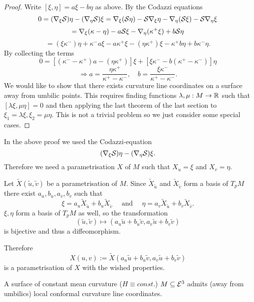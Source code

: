 \begin{proof}
	
	Write $ [\xi,\eta] = a\xi - b\eta $ as above. By the Codazzi equations
		\[ 0 = (\nabla_\xi \mathcal S)\eta - (\nabla_\eta \mathcal S) \xi = \nabla_\xi(\mathcal S\eta) - \mathcal S\nabla_\xi \eta - \nabla_\eta(\mathcal S\xi) - \mathcal S\nabla_\eta \xi  \]
		\[ = \nabla_\xi(\kappa- \eta) - a \mathcal S \xi - \nabla_\eta(\kappa^+\xi) + b\mathcal S\eta \]
		\[ = (\xi\kappa^-) \eta + \kappa^-a\xi -a\kappa^+\xi - (\eta\kappa^+)\xi - \kappa^+b\eta + b \kappa^-\eta. \]
	By collecting the terms
		\[ 0 = [ (\kappa^- -\kappa^+)a - (\eta\kappa^+) ]\xi + [ \xi \kappa^- - b(\kappa^+ - \kappa^-) ] \eta \]
		\[ \Rightarrow a = \dfrac{\eta \kappa^+}{\kappa^+ - \kappa^-}, \quad b= \dfrac{\xi \kappa^-}{\kappa^+ - \kappa^-}. \]
	We would like to show that there exists curvature line coordinates on a surface away from umbilic points. This requires finding functions $ \lambda,\mu: M \rightarrow \mathbb R $ such that $ [ \lambda\xi,\mu\eta ] = 0 $ and  then applying the last theorem of the last section to $ \xi_1 = \lambda\xi, \xi_2 = \mu \eta $. This is not a trivial problem so we just consider some special cases.
	
			
\end{proof}

\begin{remark}
	In the above proof we used the Codazzi-equation
		\[ (\nabla_\xi \mathcal S)\eta - (\nabla_\eta \mathcal S) \xi. \]
	Therefore we need a parametrisation $X$ of $M$ such that $X_u=\xi$ and $X_v=\eta$.
	
	Let $\tilde X(\tilde u,\tilde v)$ be a parametrisation of $M$. Since $\tilde X_{\tilde u}$ and $ \tilde X_{\tilde v}$ form a basis of $T_pM$ there exist $a_u,b_u,a_v,b_v$ such that
		\[ \xi=a_u \tilde X_{\tilde u} + b_u\tilde X_{\tilde v}\quad \text{ and }\quad
			\eta=a_v \tilde X_{\tilde u} + b_v\tilde X_{\tilde v}. \]
	$\xi,\eta$ form a basis of $T_pM$ as well, so the transformation
		\[ (\tilde u, \tilde v) \mapsto (a_u\tilde u+b_u\tilde v, a_v\tilde u + b_v\tilde v) \]
	is bijective and thus a diffeomorphism.
	
	Therefore
		\[ X(u,v) := \tilde X(a_u\tilde u+b_u\tilde v, a_v\tilde u + b_v\tilde v) \]
	is a parametrisation of $X$ with the wished properties.
\end{remark}

\begin{corollary}
	A surface of constant mean curvature ($ H \equiv const. $) $ M \subseteq \mathcal E^3 $ admits (away from umbilics) local conformal curvature line coordinates.
\end{corollary}

